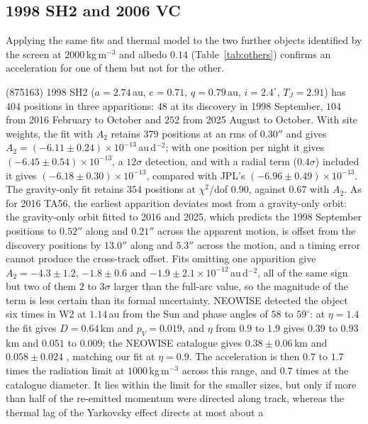 \documentclass[3p,11pt]{elsarticle}
\begin{document}
\subsection{1998 SH2 and 2006 VC}\label{sec:others}

Applying the same fits and thermal model to the two further objects identified by the
screen at $2000$\,kg\,m$^{-3}$ and albedo $0.14$ (Table~\ref{tab:others}) confirms an
acceleration for one of them but not for the other.

(875163) 1998 SH2 ($a=2.74$\,au, $e=0.71$, $q=0.79$\,au, $i=2.4^\circ$, $T_J=2.91$) has
$404$ positions in three apparitions: $48$ at its discovery in 1998 September, $104$ from
2016 February to October and $252$ from 2025 August to October. With site weights, the fit
with $A_2$ retains $379$ positions at an rms of $0.30''$ and gives
$A_2=(-6.11\pm0.24)\times10^{-13}$\,au\,d$^{-2}$; with one position per night it gives
$(-6.45\pm0.54)\times10^{-13}$, a $12\sigma$ detection, and with a radial term ($0.4\sigma$)
included it gives $(-6.18\pm0.30)\times10^{-13}$, compared with JPL's
$(-6.96\pm0.49)\times10^{-13}$. The gravity-only fit retains $354$ positions at
$\chi^2$/dof $0.90$, against $0.67$ with $A_2$. As for 2016 TA56, the earliest apparition
deviates most from a gravity-only orbit: the gravity-only orbit fitted to 2016 and 2025,
which predicts the 1998 September positions to $0.52''$ along and $0.21''$ across the
apparent motion, is offset from the discovery positions by $13.0''$ along and $5.3''$
across the motion, and a timing error cannot produce the cross-track offset. Fits omitting
one apparition give $A_2=-4.3\pm1.2$, $-1.8\pm0.6$ and
$-1.9\pm2.1\times10^{-12}$\,au\,d$^{-2}$, all of the same sign but two of them $2$ to
$3\sigma$ larger than the full-arc value, so the magnitude of the term is less certain
than its formal uncertainty. NEOWISE detected the object six times in W2 at $1.14$\,au
from the Sun and phase angles of $58$ to $59^\circ$: at $\eta=1.4$ the fit gives
$D=0.64$\,km and $p_V=0.019$, and $\eta$ from $0.9$ to $1.9$ gives $0.39$ to $0.93$\,km
and $0.051$ to $0.009$; the NEOWISE catalogue gives $0.38\pm0.06$\,km and
$0.058\pm0.024$ \citep{Masiero2017}, matching our fit at $\eta=0.9$. The acceleration is
then $0.7$ to $1.7$ times the radiation limit at $1000$\,kg\,m$^{-3}$ across this range,
and $0.7$ times at the catalogue diameter. It lies within the limit for the smaller sizes,
but only if more than half of the re-emitted momentum were directed along track, whereas
the thermal lag of the Yarkovsky effect directs at most about a
\end{document}
